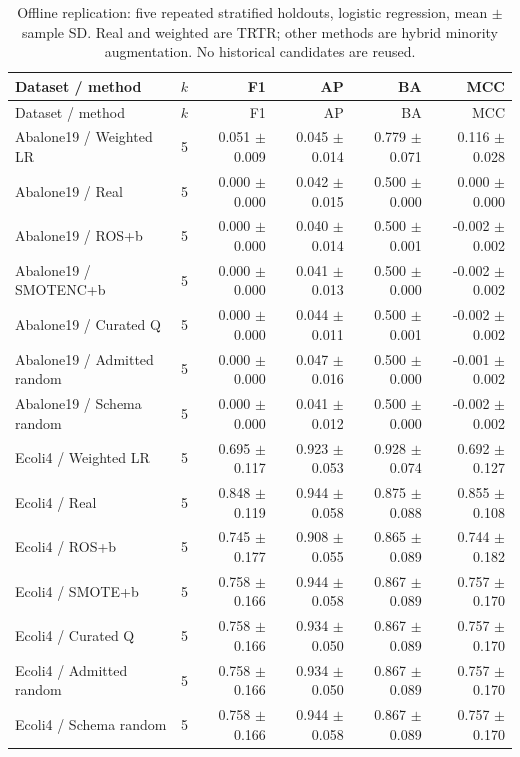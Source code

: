 \begin{longtable}{lrrrrr}
\caption{Offline replication: five repeated stratified holdouts, logistic regression, mean $\pm$ sample SD. Real and weighted are TRTR; other methods are hybrid minority augmentation. No historical candidates are reused.}\label{tab:repeated}\\
\toprule
Dataset / method & $k$ & F1 & AP & BA & MCC \\
\midrule\endfirsthead
\toprule
Dataset / method & $k$ & F1 & AP & BA & MCC \\
\midrule\endhead
Abalone19 / Weighted LR & 5 & 0.051 $\pm$ 0.009 & 0.045 $\pm$ 0.014 & 0.779 $\pm$ 0.071 & 0.116 $\pm$ 0.028 \\
Abalone19 / Real & 5 & 0.000 $\pm$ 0.000 & 0.042 $\pm$ 0.015 & 0.500 $\pm$ 0.000 & 0.000 $\pm$ 0.000 \\
Abalone19 / ROS+b & 5 & 0.000 $\pm$ 0.000 & 0.040 $\pm$ 0.014 & 0.500 $\pm$ 0.001 & -0.002 $\pm$ 0.002 \\
Abalone19 / SMOTENC+b & 5 & 0.000 $\pm$ 0.000 & 0.041 $\pm$ 0.013 & 0.500 $\pm$ 0.000 & -0.002 $\pm$ 0.002 \\
Abalone19 / Curated Q & 5 & 0.000 $\pm$ 0.000 & 0.044 $\pm$ 0.011 & 0.500 $\pm$ 0.001 & -0.002 $\pm$ 0.002 \\
Abalone19 / Admitted random & 5 & 0.000 $\pm$ 0.000 & 0.047 $\pm$ 0.016 & 0.500 $\pm$ 0.000 & -0.001 $\pm$ 0.002 \\
Abalone19 / Schema random & 5 & 0.000 $\pm$ 0.000 & 0.041 $\pm$ 0.012 & 0.500 $\pm$ 0.000 & -0.002 $\pm$ 0.002 \\
Ecoli4 / Weighted LR & 5 & 0.695 $\pm$ 0.117 & 0.923 $\pm$ 0.053 & 0.928 $\pm$ 0.074 & 0.692 $\pm$ 0.127 \\
Ecoli4 / Real & 5 & 0.848 $\pm$ 0.119 & 0.944 $\pm$ 0.058 & 0.875 $\pm$ 0.088 & 0.855 $\pm$ 0.108 \\
Ecoli4 / ROS+b & 5 & 0.745 $\pm$ 0.177 & 0.908 $\pm$ 0.055 & 0.865 $\pm$ 0.089 & 0.744 $\pm$ 0.182 \\
Ecoli4 / SMOTE+b & 5 & 0.758 $\pm$ 0.166 & 0.944 $\pm$ 0.058 & 0.867 $\pm$ 0.089 & 0.757 $\pm$ 0.170 \\
Ecoli4 / Curated Q & 5 & 0.758 $\pm$ 0.166 & 0.934 $\pm$ 0.050 & 0.867 $\pm$ 0.089 & 0.757 $\pm$ 0.170 \\
Ecoli4 / Admitted random & 5 & 0.758 $\pm$ 0.166 & 0.934 $\pm$ 0.050 & 0.867 $\pm$ 0.089 & 0.757 $\pm$ 0.170 \\
Ecoli4 / Schema random & 5 & 0.758 $\pm$ 0.166 & 0.944 $\pm$ 0.058 & 0.867 $\pm$ 0.089 & 0.757 $\pm$ 0.170 \\

\end{longtable}
